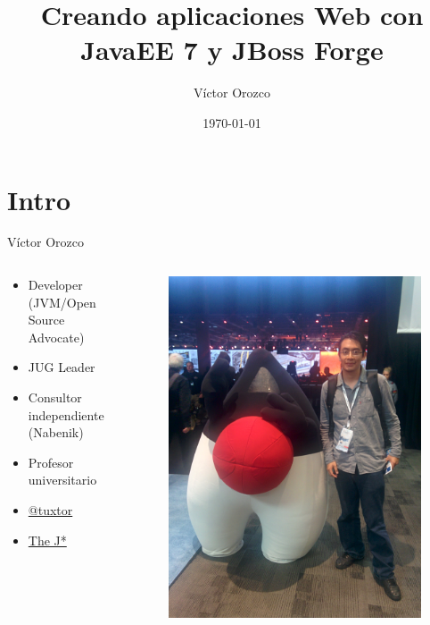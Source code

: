 \documentclass{beamer}
\title{Creando aplicaciones Web con JavaEE 7 y JBoss Forge}
\author{Víctor Orozco}
\institute{Nabenik}
\date{\today}
\begin{document}
\frame{\titlepage}

\section*{Intro}
\begin{frame}{Víctor Orozco}
	\begin{columns}[T] %
		\begin{column}[T]{5cm} %
			\begin{itemize}
				\item Developer (JVM/Open Source Advocate)
				\item JUG Leader
				\item Consultor independiente (Nabenik)
				\item Profesor universitario
				\item \href{https://twitter.com/tuxtor}{@tuxtor}
				\item \href{https://vorozco.com}{The J*} 
			\end{itemize}
		\end{column}
		\begin{column}[T]{5cm} %
			\begin{figure}
				\centering
				\includegraphics[width=0.7\linewidth]{Images/j1.jpg}
			\end{figure}
			
		\end{column}
	\end{columns}
\end{frame}
\end{document}
